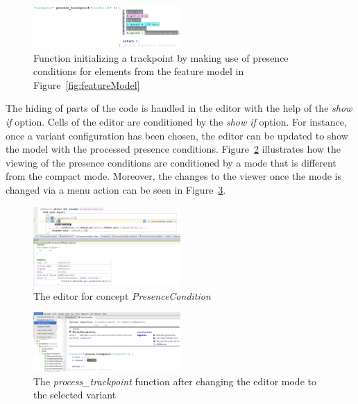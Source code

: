 \documentclass[preprint,numbers,10pt]{sigplanconf}
\begin{document}
\begin{figure}[H]
	\centering
	\includegraphics[width=0.50\textwidth]{screens/process_trackpoint.png}
	\caption{Function initializing a trackpoint by making use of presence conditions for elements from the
feature model in Figure~\ref{fig:featureModel}}
	\label{fig:presenceCond}
\end{figure}

The hiding of parts of the code is handled in the editor with the help of the \emph{show if} option.
Cells of the editor are conditioned by the \emph{show if} option. For instance, once a variant configuration has been chosen,
the editor can be updated to show the model with the processed presence conditions. Figure~\ref{fig:presenceConditionEditor}
illustrates how the viewing of the presence conditions are conditioned by a mode that is different from the compact mode.
Moreover, the changes to the viewer once the mode is changed via a menu action can be seen in Figure~\ref{fig:processTrackpointSelectedVariant}.

\begin{figure}[H]
	\centering
	\includegraphics[width=0.50\textwidth]{screens/PresenceConditionEditor.png}
	\caption{The editor for concept \emph{PresenceCondition}}
	\label{fig:presenceConditionEditor}
\end{figure}

\begin{figure}[H]
	\centering
	\includegraphics[width=0.50\textwidth]{screens/ProcessTrackpointSelectedVariant.png}
	\caption{The \emph{process\_trackpoint} function after changing the editor mode to the selected
variant}
	\label{fig:processTrackpointSelectedVariant}
\end{figure}
\end{document}
